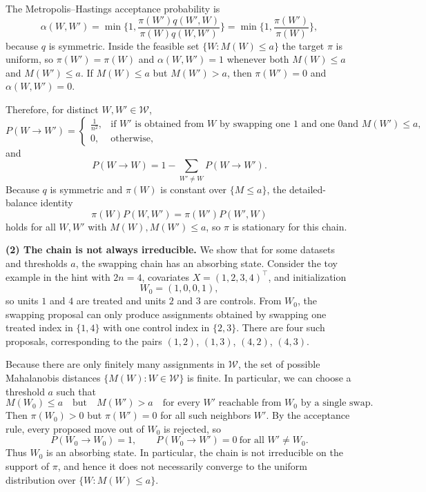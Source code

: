 \documentclass[answers,12pt,addpoints]{exam}
\begin{document}
\begin{questions}
\begin{solution}
The Metropolis--Hastings acceptance probability is
\[
\alpha(W,W') = \min\Big\{1, \frac{\pi(W')q(W',W)}{\pi(W)q(W,W')}\Big\}
= \min\Big\{1, \frac{\pi(W')}{\pi(W)}\Big\},
\]
because $q$ is symmetric.
Inside the feasible set $\{W : M(W) \le a\}$ the target $\pi$ is uniform, so
$\pi(W') = \pi(W)$ and $\alpha(W,W') = 1$ whenever both $M(W)\le a$ and $M(W')\le a$.
If $M(W)\le a$ but $M(W')>a$, then $\pi(W') = 0$ and $\alpha(W,W') = 0$.

Therefore, for distinct $W,W'\in\mathcal{W}$,
\[
P(W \to W')
=
\begin{cases}
\displaystyle \frac{1}{n^2}, &\text{if $W'$ is obtained from $W$ by swapping one $1$ and one $0$
and $M(W')\le a$,}\\[0.5em]
0, &\text{otherwise,}
\end{cases}
\]
and
\[
P(W \to W) = 1 - \sum_{W'\neq W} P(W\to W').
\]
Because $q$ is symmetric and $\pi(W)$ is constant over $\{M\le a\}$, the detailed-balance
identity
\[
\pi(W)P(W,W') = \pi(W')P(W',W)
\]
holds for all $W,W'$ with $M(W),M(W')\le a$, so $\pi$ is stationary for this chain.
\end{solution}

\begin{solution}

\textbf{(2) The chain is not always irreducible.}
We show that for some datasets and thresholds $a$, the swapping chain has an absorbing state.
Consider the toy example in the hint with $2n=4$, covariates $X = (1,2,3,4)^\top$,
and initialization
\[
W_0 = (1,0,0,1),
\]
so units $1$ and $4$ are treated and units $2$ and $3$ are controls.
From $W_0$, the swapping proposal can only produce assignments obtained by swapping
one treated index in $\{1,4\}$ with one control index in $\{2,3\}$.
There are four such proposals, corresponding to the pairs $(1,2)$, $(1,3)$, $(4,2)$, $(4,3)$.

Because there are only finitely many assignments in $\mathcal{W}$, the set of possible Mahalanobis distances $\{M(W): W\in\mathcal{W}\}$ is finite. In particular, we can choose a threshold $a$ such that
\[
M(W_0) \le a
\quad\text{but}\quad
M(W') > a \quad\text{for every $W'$ reachable from $W_0$ by a single swap}.
\]
Then $\pi(W_0) > 0$ but $\pi(W') = 0$ for all such neighbors $W'$.
By the acceptance rule, every proposed move out of $W_0$ is rejected, so
\[
P(W_0 \to W_0) = 1,\qquad P(W_0 \to W') = 0 \ \text{for all } W'\neq W_0.
\]
Thus $W_0$ is an absorbing state.
In particular, the chain is not irreducible on the support of $\pi$, and hence it does
not necessarily converge to the uniform distribution over $\{W: M(W)\le a\}$.


\end{solution}
\end{questions}
\end{document}
